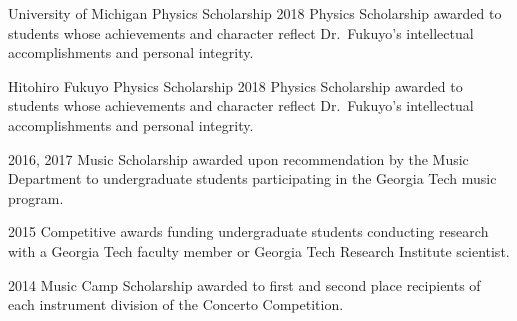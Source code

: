 
\begin{minipage}[t]{0.2\textwidth}
	\flushleft
\end{minipage}
\begin{minipage}[t]{0.8\textwidth}
	\award
  {University of Michigan Physics Scholarship}
  {2018}
  {Physics Scholarship awarded to students whose achievements and character reflect Dr.\ Fukuyo's intellectual accomplishments and personal integrity.}

	\award
  {Hitohiro Fukuyo Physics Scholarship}
  {2018}
  {Physics Scholarship awarded to students whose achievements and character reflect Dr.\ Fukuyo's intellectual accomplishments and personal integrity.}

  {2016, 2017}
  {Music Scholarship awarded upon recommendation by the Music Department to undergraduate students participating in the Georgia Tech music program.}

  {2015}
  {Competitive awards funding undergraduate students conducting research with a Georgia Tech faculty member or Georgia Tech Research Institute scientist.}
	
  {2014}
  {Music Camp Scholarship awarded to first and second place recipients of each instrument division of the Concerto Competition.}
\end{minipage}

\vspace{8pt}
